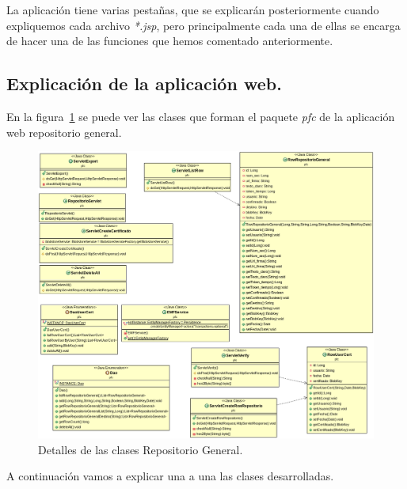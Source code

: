 La aplicación tiene varias pestañas, que se explicarán posteriormente cuando expliquemos cada archivo \textit{*.jsp}, pero principalmente cada una de ellas se encarga de hacer una de las funciones que hemos comentado anteriormente.

\subsection{Explicación de la aplicación web.}
En la figura~\ref{fig:clasesReposotorioGeneral} se puede ver las clases que forman el paquete \textit{pfc} de la aplicación web repositorio general.

\begin{figure}
  \centering
    \includegraphics[scale=0.5]{./GoogleAppEngine/imagenes/UML_repositorio.png}
  \caption{Detalles de las clases Repositorio General.}
  \label{fig:clasesReposotorioGeneral}
\end{figure}

A continuación vamos a explicar una a una las clases desarrolladas.


